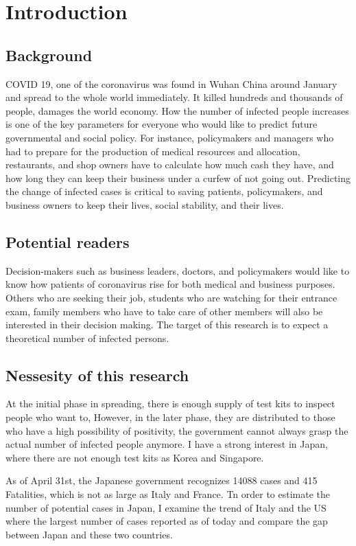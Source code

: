 \section{Introduction}
\subsection{Background}
COVID 19, one of the coronavirus was found in Wuhan China around January and spread to the whole world immediately. It killed hundreds and thousands of people, damages the world economy. How the number of infected people increases is one of the key parameters for everyone who would like to predict future governmental and social policy. For instance, policymakers and managers who had to prepare for the production of medical resources and allocation, restaurants, and shop owners have to calculate how much cash they have, and how long they can keep their business under a curfew of not going out. Predicting the change of infected cases is critical to saving patients, policymakers, and business owners to keep their lives, social stability, and their lives.

\subsection{Potential readers}
Decision-makers such as business leaders, doctors, and policymakers would like to know how patients of coronavirus rise for both medical and business purposes. Others who are seeking their job, students who are watching for their entrance exam, family members who have to take care of other members will also be interested in their decision making.
The target of this research is to expect a theoretical number of infected persons.

\subsection{Nessesity of this research}
At the initial phase in spreading, there is enough supply of test kits to inspect people who want to, 
However, in the later phase, they are distributed to those who have a high possibility of positivity, the government cannot always grasp the actual number of infected people anymore.
I have a strong interest in Japan, where there are not enough test kits as Korea and Singapore. 

As of April 31st, the Japanese government recognizes 14088 cases and 415 Fatalities, which is not as large as Italy and France.
Tn order to estimate the number of potential cases in Japan, I  examine the trend of Italy and the US where the largest number of cases reported as of today and compare the gap between Japan and these two countries.
